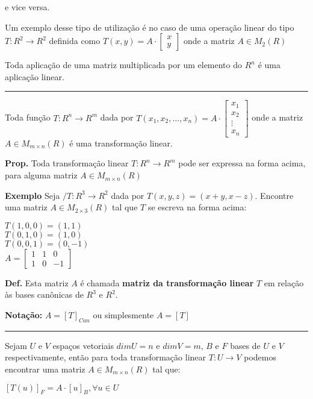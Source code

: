\documentclass[10pt,landscape]{article}
\begin{document}
\begin{multicols}{3}
e vice versa.

Um exemplo desse tipo de utilização é no caso de uma operação linear do tipo $T:R^2\rightarrow R^2$ definida como $T(x,y)=A\cdot\begin{bmatrix}x\\y\end{bmatrix}$ onde a matriz $A \in M_2(R)$ 

Toda aplicação de uma matriz multiplicada por um elemento do $R^n$ é uma aplicação linear.

\medskip
\hrule
\medskip

Toda função $T:R^n\rightarrow R^m$ dada por $T(x_1,x_2,\ldots,x_n)=A\cdot\begin{bmatrix}x_1\\x_2\\ \vdots\\ x_n\end{bmatrix}$ onde a matriz $A \in M_{m\times n}(R)$ é uma transformação linear.

\textbf{Prop.} Toda transformação linear $T:R^n\rightarrow R^m$ pode ser expressa na forma acima, para alguma matriz $A\in M_{m\times n}(R)$

\textbf{Exemplo} Seja $/T:R^3\rightarrow R^2$ dada por $T(x,y,z)=(x+y,x-z)$. Encontre uma matriz $A \in M_{2\times 3}(R)$ tal que $T$ se escreva na forma acima:

\medskip
$T(1,0,0)=(1, 1)$\\
$T(0,1,0)=(1, 0)$\\
$T(0,0,1)=(0,-1)$\\
\medskip
$A=\begin{bmatrix}1&1&0\\1&0&-1\end{bmatrix}$

\textbf{Def.} Esta matriz $A$ é chamada \textbf{matriz da transformação linear} $T$ em relação às bases canônicas de $R^3$ e $R^2$.

\textbf{Notação:} $A=[T]_{Can}$ ou simplesmente $A=[T]$

\medskip
\hrule
\medskip

Sejam $U$ e $V$ espaços vetoriais $dimU=n$ e $dimV=m$, $B$ e $F$ bases de $U$ e $V$ respectivamente, então para toda transformação linear $T:U\rightarrow V$ podemos encontrar uma matriz $A\in M_{m\times n}(R)$ tal que:

\medskip

$[T(u)]_F=A\cdot [u]_B, \forall u\in U$

\medskip


\end{multicols}
\end{document}
